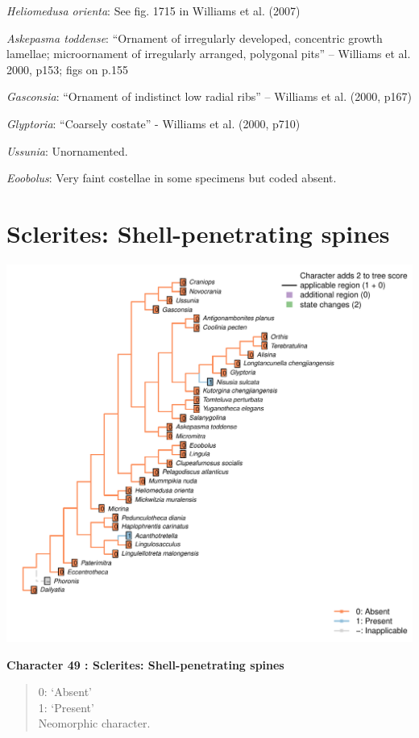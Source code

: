 \documentclass[]{book}
\theoremstyle{definition}
\theoremstyle{definition}
\theoremstyle{definition}
\theoremstyle{remark}
\begin{document}
\emph{Heliomedusa orienta}: See fig. 1715 in Williams et al. (2007)

\emph{Askepasma toddense}: ``Ornament of irregularly developed,
concentric growth lamellae; microornament of irregularly arranged,
polygonal pits'' -- Williams et al. 2000, p153; figs on p.155

\emph{Gasconsia}: ``Ornament of indistinct low radial ribs'' -- Williams
et al. (2000, p167)

\emph{Glyptoria}: ``Coarsely costate'' - Williams et al. (2000, p710)

\emph{Ussunia}: Unornamented.

\emph{Eoobolus}: Very faint costellae in some specimens but coded
absent.

\hypertarget{sclerites-shell-penetrating-spines}{%
\section*{Sclerites: Shell-penetrating
spines}\label{sclerites-shell-penetrating-spines}}

\includegraphics{Brachiopod_phylogeny_files/figure-latex/unnamed-chunk-5-49.pdf}

\textbf{Character 49 : Sclerites: Shell-penetrating spines }

\begin{quote}
0: `Absent'\\
1: `Present'\\
Neomorphic character.
\end{quote}
\end{document}

